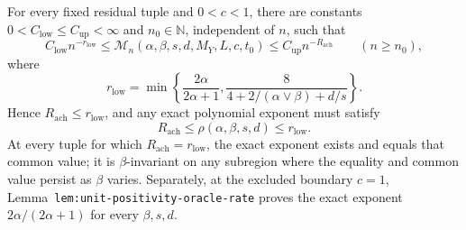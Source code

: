 For every fixed residual tuple and \(0<c<1\), there are constants \(0<C_{\mathrm{low}}\le C_{\mathrm{up}}<\infty\) and \(n_0\in\mathbb N\), independent of \(n\), such that \[C_{\mathrm{low}}n^{-r_{\mathrm{low}}}\le\mathcal M_n(\alpha,\beta,s,d,M_Y,L,c,t_0)\le C_{\mathrm{up}}n^{-R_{\mathrm{ach}}}\qquad(n\ge n_0),\] where \[r_{\mathrm{low}}=\min\left\{\frac{2\alpha}{2\alpha+1},\frac{8}{4+2/(\alpha\vee\beta)+d/s}\right\}.\] Hence \(R_{\mathrm{ach}}\le r_{\mathrm{low}}\), and any exact polynomial exponent must satisfy \[R_{\mathrm{ach}}\le\rho(\alpha,\beta,s,d)\le r_{\mathrm{low}}.\] At every tuple for which \(R_{\mathrm{ach}}=r_{\mathrm{low}}\), the exact exponent exists and equals that common value; it is \(\beta\)-invariant on any subregion where the equality and common value persist as \(\beta\) varies. Separately, at the excluded boundary \(c=1\), Lemma~\texttt{lem:unit-positivity-oracle-rate} proves the exact exponent \(2\alpha/(2\alpha+1)\) for every \(\beta,s,d\).